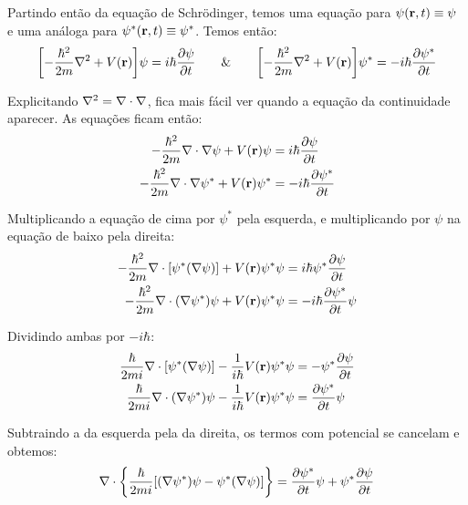 Partindo então da equação de Schrödinger, temos uma equação para $\psi(\vb{r},t)\equiv\psi$ e uma análoga para $\psi^{\ast}(\vb{r},t)\equiv\psi^{\ast}$. Temos então:
    \begin{align*}
        \qty[
            -\dfrac{\hbar^2}{2m} \nabla^2 + V(\vb{r})
        ]\psi = i\hbar\pdv{\psi}{t} \qquad \& \qquad
        \qty[
            -\dfrac{\hbar^2}{2m} \nabla^2 + V(\vb{r})
        ]\psi^{\ast} = -i\hbar\pdv{\psi^{\ast}}{t}
    \end{align*}

Explicitando $\nabla^2 = \vb{\nabla}\cdot\vb{\nabla}$, fica mais fácil ver quando a equação da continuidade aparecer. As equações ficam então:
    \begin{align*}
        -\dfrac{\hbar^2}{2m} \vb{\nabla}\cdot\vb{\nabla}\psi + V(\vb{r})\psi
        &= i\hbar\pdv{\psi}{t} \\
        -\dfrac{\hbar^2}{2m} \vb{\nabla}\cdot\vb{\nabla}\psi^{\ast} + V(\vb{r})\psi^{\ast}
        &= -i\hbar\pdv{\psi^{\ast}}{t}
    \end{align*}

Multiplicando a equação de cima por $\psi^{\ast}$ pela esquerda, e multiplicando por $\psi$ na equação de baixo pela direita:
    \begin{align*}
        -\dfrac{\hbar^2}{2m} \vb{\nabla}\cdot[\psi^{\ast}(\vb{\nabla}\psi)] + V(\vb{r})\psi^{\ast}\psi
        &= i\hbar\psi^{\ast}\pdv{\psi}{t} \\
        -\dfrac{\hbar^2}{2m} \vb{\nabla}\cdot(\vb{\nabla}\psi^{\ast})\psi + V(\vb{r})\psi^{\ast}\psi
        &= -i\hbar\pdv{\psi^{\ast}}{t}\psi
    \end{align*}

Dividindo ambas por $-i\hbar$:
    \begin{align*}
        \dfrac{\hbar}{2mi} \vb{\nabla}\cdot[\psi^{\ast}(\vb{\nabla}\psi)] - \dfrac{1}{i\hbar}V(\vb{r})\psi^{\ast}\psi
        &= -\psi^{\ast}\pdv{\psi}{t} \\
        \dfrac{\hbar}{2mi} \vb{\nabla}\cdot(\vb{\nabla}\psi^{\ast})\psi - \dfrac{1}{i\hbar}V(\vb{r})\psi^{\ast}\psi
        &= \pdv{\psi^{\ast}}{t}\psi
    \end{align*}

Subtraindo a da esquerda pela da direita, os termos com potencial se cancelam e obtemos:
    \begin{equation*}
        \vb{\nabla}\cdot \qty{
            \dfrac{\hbar}{2mi}\qty[
                (\vb{\nabla}\psi^{\ast}) \psi - \psi^{\ast}(\vb{\nabla}\psi)
            ]
        } = 
        \pdv{\psi^{\ast}}{t}\psi + \psi^{\ast}\pdv{\psi}{t}
    \end{equation*}

